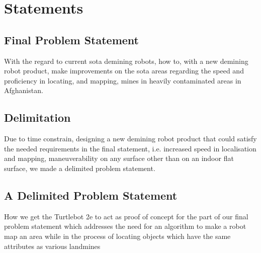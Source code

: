 \chapter{Statements}

\section{Final Problem Statement}

With the regard to current \gls{sota} demining robots, how to, with a new demining robot product, make improvements on the \gls{sota} areas regarding the speed and proficiency in locating, and mapping, mines in heavily contaminated areas in Afghanistan.

\section{Delimitation}

Due to time constrain, designing a new demining robot product that could satisfy the needed requirements in the final statement, i.e. increased speed in localisation and mapping, maneuverability on any surface other than on an indoor flat surface, we made a delimited problem statement.

\section{A Delimited Problem Statement}\label{delimit_statement}

How we get the Turtlebot 2e to act as proof of concept for the part of our final problem statement which addresses the need for an algorithm to make a robot map an area while in the process of locating objects which have the same attributes as various landmines    